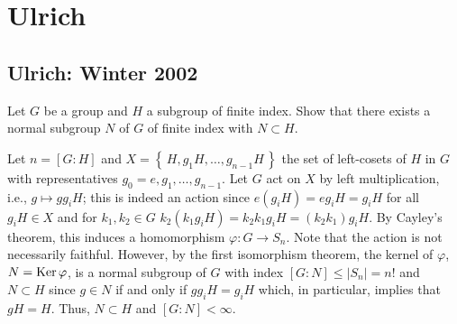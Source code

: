 \section{Ulrich}
\subsection{Ulrich: Winter 2002}
\setcounter{exercise}{0}
\setcounter{equation}{0}

\begin{problem}
  Let $G$ be a group and $H$ a subgroup of finite index. Show that there
  exists a normal subgroup $N$ of $G$ of finite index with $N\subset H$.
\end{problem}
\begin{solution}
  Let $n=[G:H]$ and $X=\left\{\,H,g_1H,\ldots,g_{n-1}H\,\right\}$ the set
  of left-cosets of $H$ in $G$ with representatives
  $g_0=e,g_1,\ldots,g_{n-1}$. Let $G$ act on $X$ by left multiplication,
  i.e., $g\mapsto g g_iH$; this is indeed an action since
  $e(g_iH)=eg_iH=g_iH$ for all $g_iH\in X$ and for $k_1,k_2\in G$
  $k_2(k_1g_iH)=k_2k_1g_iH=(k_2k_1)g_iH$. By Cayley's theorem, this induces
  a homomorphism $\varphi\colon G\to S_n$. Note that the action is not
  necessarily faithful. However, by the first isomorphism theorem, the
  kernel of $\varphi$, $N=\operatorname{Ker}\varphi$, is a normal subgroup of $G$ with
  index $[G:N]\leq |S_n|=n!$ and $N\subset H$ since $g\in N$ if and only if
  $gg_iH=g_iH$ which, in particular, implies that $gH=H$. Thus, $N\subset
  H$ and $[G:N]<\infty$.
\end{solution}

